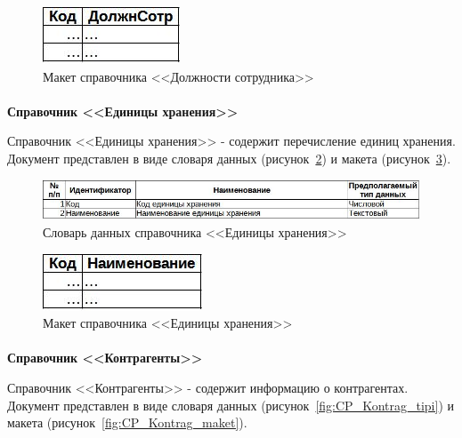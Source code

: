 \documentclass[12pt, a4paper, simple]{eskdtext}
\begin{document}
    \begin{figure}[!h]
        \centering
        \includegraphics[]
            {_docs/СП_ДолжнСотр_макет.jpg}
        \caption{Макет справочника <<Должности сотрудника>>}
        \label{fig:CP_DoljnCotr_maket}
    \end{figure}

    \paragraph{} \textbf{Справочник <<Единицы хранения>>}

    Справочник <<Единицы хранения>> - содержит перечисление единиц хранения.
    Документ представлен в виде словаря данных (рисунок~\ref{fig:CP_EdXran_tipi})
    и макета (рисунок~\ref{fig:CP_EdXran_maket}).

    \begin{figure}[!h]
        \centering
        \includegraphics[width=14cm]
            {_docs/СП_ЕдХран_типы.jpg}
        \caption{Словарь данных справочника <<Единицы хранения>>}
        \label{fig:CP_EdXran_tipi}
    \end{figure}

    \begin{figure}[!h]
        \centering
        \includegraphics[]
            {_docs/СП_ЕдХран_макет.jpg}
        \caption{Макет справочника <<Единицы хранения>>}
        \label{fig:CP_EdXran_maket}
    \end{figure}

    \paragraph{} \textbf{Справочник <<Контрагенты>>}

    Справочник <<Контрагенты>> - содержит информацию о контрагентах.
    Документ представлен в виде словаря данных (рисунок~\ref{fig:CP_Kontrag_tipi})
    и макета (рисунок~\ref{fig:CP_Kontrag_maket}).
\end{document}
